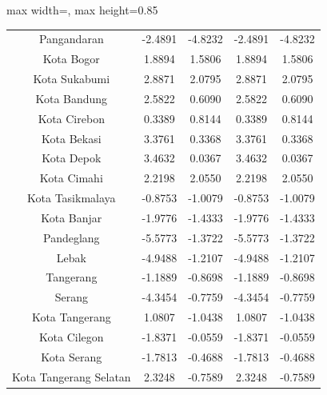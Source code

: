 \begin{table}[H]
\begin{adjustbox}{max width=\textwidth, max height=0.85\textheight}
\begin{tabular}{|c|c|c|c|c|}
Pangandaran & -2.4891 & -4.8232 & -2.4891 & -4.8232 \\
Kota Bogor & 1.8894 & 1.5806 & 1.8894 & 1.5806 \\
Kota Sukabumi & 2.8871 & 2.0795 & 2.8871 & 2.0795 \\
Kota Bandung & 2.5822 & 0.6090 & 2.5822 & 0.6090 \\
Kota Cirebon & 0.3389 & 0.8144 & 0.3389 & 0.8144 \\
Kota Bekasi & 3.3761 & 0.3368 & 3.3761 & 0.3368 \\
Kota Depok & 3.4632 & 0.0367 & 3.4632 & 0.0367 \\
Kota Cimahi & 2.2198 & 2.0550 & 2.2198 & 2.0550 \\
Kota Tasikmalaya & -0.8753 & -1.0079 & -0.8753 & -1.0079 \\
Kota Banjar & -1.9776 & -1.4333 & -1.9776 & -1.4333 \\
Pandeglang & -5.5773 & -1.3722 & -5.5773 & -1.3722 \\
Lebak & -4.9488 & -1.2107 & -4.9488 & -1.2107 \\
Tangerang & -1.1889 & -0.8698 & -1.1889 & -0.8698 \\
Serang & -4.3454 & -0.7759 & -4.3454 & -0.7759 \\
Kota Tangerang & 1.0807 & -1.0438 & 1.0807 & -1.0438 \\
Kota Cilegon & -1.8371 & -0.0559 & -1.8371 & -0.0559 \\
Kota Serang & -1.7813 & -0.4688 & -1.7813 & -0.4688 \\
Kota Tangerang Selatan & 2.3248 & -0.7589 & 2.3248 & -0.7589 \\
\hline
\end{tabular}
\end{adjustbox}
\end{table}
